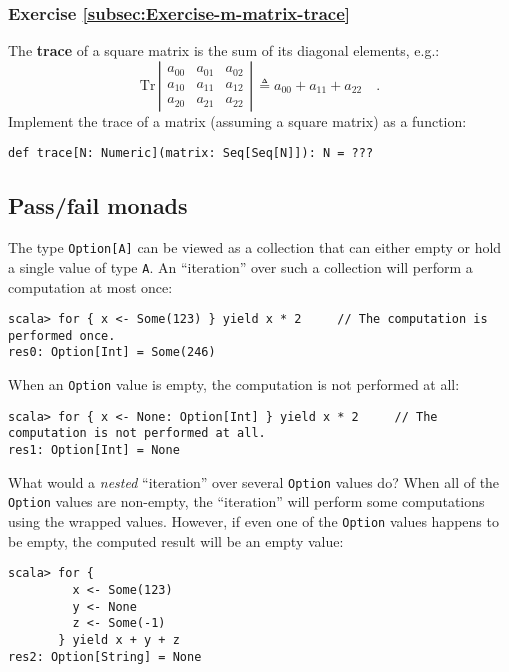 \subsubsection{Exercise \label{subsec:Exercise-m-matrix-trace}\ref{subsec:Exercise-m-matrix-trace}}

The \textbf{trace} of a square matrix is
the sum of its diagonal elements, e.g.:
\[
\text{Tr}\,\left|\begin{array}{ccc}
a_{00} & a_{01} & a_{02}\\
a_{10} & a_{11} & a_{12}\\
a_{20} & a_{21} & a_{22}
\end{array}\right|\,\triangleq a_{00}+a_{11}+a_{22}\quad.
\]
Implement the trace of a matrix (assuming a square matrix) as a function:
\begin{lstlisting}
def trace[N: Numeric](matrix: Seq[Seq[N]]): N = ???
\end{lstlisting}


\subsection{Pass/fail monads\label{subsec:Pass/fail-monads}}

The type \lstinline!Option[A]! can be viewed as a collection that
can either empty or hold a single value of type \lstinline!A!. An
\textsf{``}iteration\textsf{''} over such a collection will perform a computation
at most once:
\begin{lstlisting}
scala> for { x <- Some(123) } yield x * 2     // The computation is performed once.
res0: Option[Int] = Some(246) 
\end{lstlisting}
When an \lstinline!Option! value is empty, the computation is not
performed at all:
\begin{lstlisting}
scala> for { x <- None: Option[Int] } yield x * 2     // The computation is not performed at all.
res1: Option[Int] = None
\end{lstlisting}
What would a \emph{nested} \textsf{``}iteration\textsf{''} over several \lstinline!Option!
values do? When all of the \lstinline!Option! values are non-empty,
the \textsf{``}iteration\textsf{''} will perform some computations using the wrapped
values. However, if even one of the \lstinline!Option! values happens
to be empty, the computed result will be an empty value:
\begin{lstlisting}
scala> for {
         x <- Some(123)
         y <- None
         z <- Some(-1)
       } yield x + y + z
res2: Option[String] = None
\end{lstlisting}


